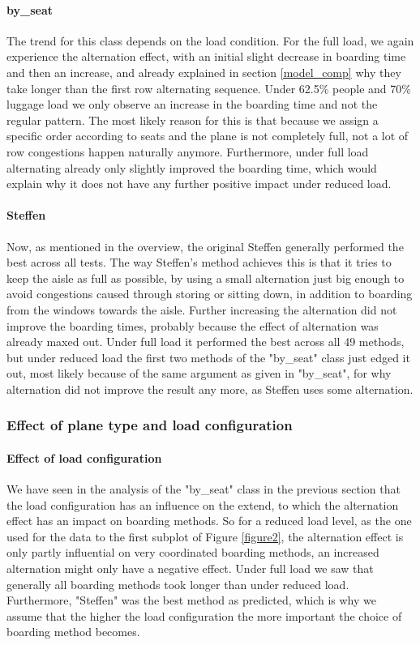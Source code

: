 \documentclass[11pt]{article}
\begin{document}
 \paragraph{by\_seat}
 The trend for this class depends on the load condition. For the full load, we again experience the alternation effect, with an initial slight decrease in boarding time and then an increase, and already explained in section \ref{model_comp} why they take longer than the first row alternating sequence. Under 62.5\% people and 70\% luggage load we only observe an increase in the boarding time and not the regular pattern. The most likely reason for this is that because we assign a specific order according to seats and the plane is not completely full, not a lot of row congestions happen naturally anymore. Furthermore, under full load alternating already only slightly improved the boarding time, which would explain why it does not have any further positive impact under reduced load. 
 
 \paragraph{Steffen}
 Now, as mentioned in the overview, the original Steffen generally performed the best across all tests. The way Steffen's method achieves this is that it tries to keep the aisle as full as possible, by using a small alternation just big enough to avoid congestions caused through storing or sitting down, in addition to boarding from the windows towards the aisle. Further increasing the alternation did not improve the boarding times, probably because the effect of alternation was already maxed out. Under full load it performed the best across all 49 methods, but under reduced load the first two methods of the "by\_seat" class just edged it out, most likely because of the same argument as given in "by\_seat", for why alternation did not improve the result any more, as Steffen uses some alternation. 
 
 
 
 \subsubsection{Effect of plane type and load configuration}
 \paragraph{Effect of load configuration}
 We have seen in the analysis of the "by\_seat" class in the previous section that the load configuration has an influence on the extend, to which the alternation effect has an impact on boarding methods. So for a reduced load level, as the one used for the data to the first subplot of Figure \ref{figure2}, the alternation effect is only partly influential on very coordinated boarding methods, an increased alternation might only have a negative effect. Under full load we saw that generally all boarding methods took longer than under reduced load. Furthermore, "Steffen" was the best method as predicted, which is why we assume that the higher the load configuration the more important the choice of boarding method becomes.
 
\end{document}
